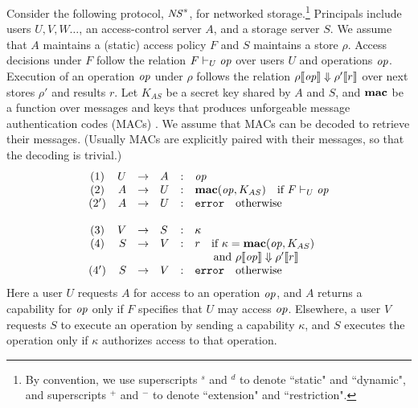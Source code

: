 \documentclass[10pt]{article}
\newcommand{\func}[1]{{\bf #1}}
\newcommand{\op}{{\it op}}
\begin{document}
Consider the following protocol, ${\it NS}^s$, for networked storage.\footnote{By convention, we use superscripts ${}^s$ and ${}^d$ to denote ``static" and ``dynamic", and superscripts ${}^+$ and ${}^-$ to denote ``extension" and ``restriction".} Principals include users $U,V,W\dots$, an access-control server $A$, and a storage server $S$. We assume that $A$ maintains a (static) access policy $F$ and $S$ maintains a store $\rho$. Access decisions under $F$ follow the relation $F \vdash_U \op$ over users $U$ and operations $\op$. Execution of an operation $\op$ under $\rho$ follows the relation $\rho\llbracket\op\rrbracket \Downarrow \rho'\llbracket r\rrbracket$ over next stores $\rho'$ and results $r$. Let $K_{AS}$ be a secret key shared by $A$ and $S$, and $\func{mac}$ be a function over messages and keys that produces unforgeable message authentication codes (MACs) \cite{lecnotes}. We assume that MACs can be decoded to retrieve their messages. (Usually MACs are explicitly paired with their messages, so that the decoding is trivial.)
\[
\left.
\begin{array}{crclcl}
 (1) & U & \rightarrow  & A & : & \op \\
 (2) & A & \rightarrow  & U & : & \func{mac}(\op,K_{AS})~~\mbox{ if }F \vdash_U \op \\
 (2') & A & \rightarrow  & U & : & \mathtt{error}~~\mbox{ otherwise } \\
 \\
(3) & V & \rightarrow  & S & : & \kappa \\
 (4) & S & \rightarrow  & V & : & r~~\mbox{ if }\kappa = \func{mac}(\op,K_{AS})\\
 &&&&&~~~~\mbox{ and }\rho\llbracket \op\rrbracket \Downarrow \rho'\llbracket r\rrbracket \\
 (4') & S & \rightarrow  & V & : & \mathtt{error}~~\mbox{ otherwise }
 \end{array}
\right.
\]
Here a user $U$ requests $A$ for access to an operation $\op$, and $A$ returns a capability for $\op$ only if $F$ specifies that $U$ may access $\op$. Elsewhere, a user $V$ requests $S$ to execute an operation by sending a capability $\kappa$, and $S$ executes the operation only if $\kappa$ authorizes access to that operation.
\end{document}
